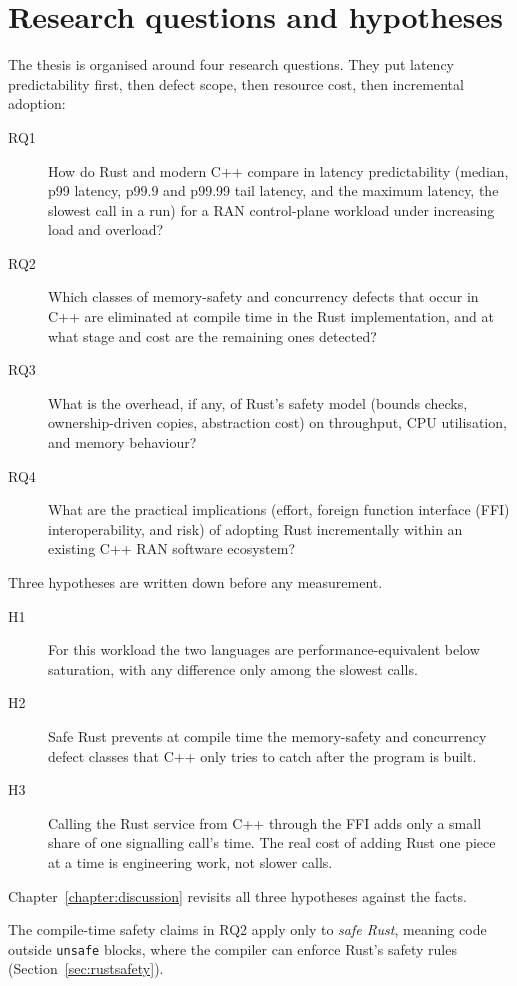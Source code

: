 \documentclass[english,oneside,a4paper,censored,csm,software-track-2020]{HYthesisML}
\begin{document}
\section{Research questions and hypotheses}\label{sec:rqs}
The thesis is organised around four research questions. They put latency predictability
first, then defect scope, then resource cost, then incremental adoption:

\begin{description}
  \item[RQ1] How do Rust and modern C++ compare in latency predictability (median, p99 latency,
        p99.9 and p99.99 tail latency, and the maximum latency, the slowest call in a run)
        for a RAN control-plane workload under increasing load and overload?
  \item[RQ2] Which classes of memory-safety and concurrency defects that occur in C++ are
        eliminated at compile time in the Rust implementation, and at what stage and cost
        are the remaining ones detected?
  \item[RQ3] What is the overhead, if any, of Rust's safety model (bounds checks,
        ownership-driven copies, abstraction cost) on throughput, CPU utilisation, and
        memory behaviour?
  \item[RQ4] What are the practical implications (effort, foreign function interface (FFI)
        interoperability, and risk) of adopting Rust incrementally within an existing C++ RAN
        software ecosystem?
\end{description}

Three hypotheses are written down before any measurement.
\begin{description}
  \item[H1] For this workload the two languages are performance-equivalent below
        saturation, with any difference only among the slowest calls.
  \item[H2] Safe Rust prevents at compile time the memory-safety and concurrency defect
        classes that C++ only tries to catch after the program is built.
  \item[H3] Calling the Rust service from C++ through the FFI adds only a small
        share of one signalling call's time. The real cost of adding Rust one
        piece at a time is engineering work, not slower calls.
\end{description}
Chapter~\ref{chapter:discussion} revisits all three hypotheses against the facts.

The compile-time safety claims in RQ2 apply only to \emph{safe Rust},
meaning code outside \texttt{unsafe} blocks, where the compiler can
enforce Rust's safety rules (Section~\ref{sec:rustsafety}).
\end{document}
